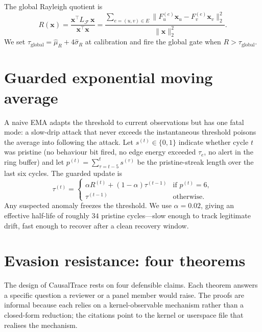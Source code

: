 The global Rayleigh quotient is
\begin{equation}
  R(\mathbf{x}) = \frac{\mathbf{x}^{\!\top} L_\mathcal{F}\, \mathbf{x}}{\mathbf{x}^{\!\top} \mathbf{x}}
  = \frac{\sum_{e = (u,v) \in E} \|F_u^{(e)} \mathbf{x}_u - F_v^{(e)} \mathbf{x}_v\|_2^2}
         {\|\mathbf{x}\|_2^2}.
  \label{eq:rayleigh}
\end{equation}
We set $\tau_{\text{global}} = \hat\mu_R + 4\hat\sigma_R$ at calibration and
fire the global gate when $R > \tau_{\text{global}}$.

\section{Guarded exponential moving average}
\label{sec:ema}

A naive EMA adapts the threshold to current observations but has one fatal
mode: a slow-drip attack that never exceeds the instantaneous threshold
poisons the average into following the attack. Let $s^{(t)} \in \{0, 1\}$
indicate whether cycle $t$ was pristine (no behaviour bit fired, no edge
energy exceeded $\tau_e$, no alert in the ring buffer) and let $p^{(t)} =
\sum_{\tau = t-5}^{t} s^{(\tau)}$ be the pristine-streak length over the
last six cycles. The guarded update is
\begin{equation}
  \tau^{(t)} =
  \begin{cases}
    \alpha R^{(t)} + (1 - \alpha)\tau^{(t-1)} & \text{if } p^{(t)} = 6, \\[1mm]
    \tau^{(t-1)} & \text{otherwise}.
  \end{cases}
  \label{eq:guarded-ema}
\end{equation}
Any suspected anomaly freezes the threshold. We use $\alpha = 0.02$, giving
an effective half-life of roughly $34$ pristine cycles---slow enough to
track legitimate drift, fast enough to recover after a clean recovery
window.

\section{Evasion resistance: four theorems}
\label{sec:theorems}

The design of CausalTrace rests on four defensible claims. Each theorem
answers a specific question a reviewer or a panel member would raise. The
proofs are informal because each relies on a kernel-observable mechanism
rather than a closed-form reduction; the citations point to the kernel or
userspace file that realises the mechanism.

